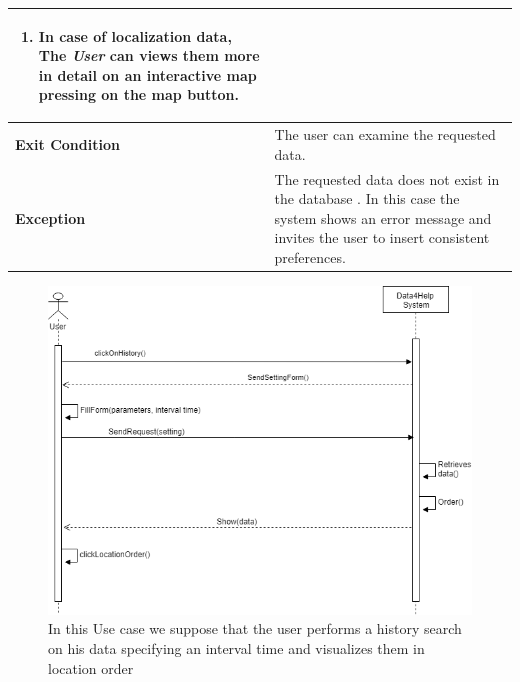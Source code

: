 \begin{table}[H]
\begin{tabular}{|p{3.5cm}|p{10.3cm}|}
\begin{enumerate}[leftmargin=0.5cm]
           \item In case of localization data, The \emph{User} 
           can views them more in detail on an interactive map pressing on the map button.            \end{enumerate}
    										\\
    \hline
    \textbf{\large{Exit Condition}} 	& The user can examine the requested data. \\
    
    \hline
    \textbf{\large{Exception}} 			& The requested data does not exist in the database . \newline
    In this case the system shows an error message and invites the user to insert consistent preferences.\\
    
    \hline
    
    
    \end{tabular}
	
\end{table}
\begin{figure}[H]
    \centering
    \includegraphics[scale=0.4]{rasdL/Pictures/history.png}
     \caption{In this Use case we suppose that the user performs a history search on his data specifying an interval time and visualizes them in location order}
    
\end{figure}
